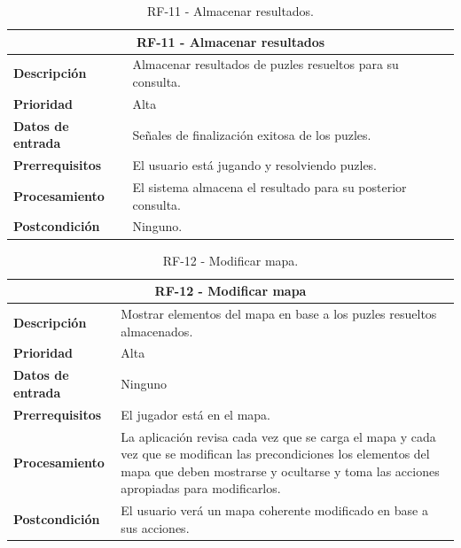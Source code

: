 \begin{table}[H]
	\centering
	\caption{RF-11 - Almacenar resultados.}
	\label{table:RF11}
	\begin{tabular}{|l|p{10cm}|}
		\hline
		\multicolumn{2}{|c|}{\textbf{RF-11 - Almacenar resultados}} \\
		\hline
		\textbf{Descripción} & Almacenar resultados de puzles resueltos para su consulta. \\
		\hline
		\textbf{Prioridad} & Alta \\
		\hline
		\textbf{Datos de entrada} & Señales de finalización exitosa de los puzles. \\
		\hline
		\textbf{Prerrequisitos} & El usuario está jugando y resolviendo puzles. \\
		\hline
		\textbf{Procesamiento} & El sistema almacena el resultado para su posterior consulta. \\
		\hline
		\textbf{Postcondición} & Ninguno. \\
		\hline
	\end{tabular}
	
\end{table}
\begin{table}[H]
	\centering
	\caption{RF-12 - Modificar mapa.}
	\label{table:RF12}
	\begin{tabular}{|l|p{10cm}|}
		\hline
		\multicolumn{2}{|c|}{\textbf{RF-12 - Modificar mapa}} \\
		\hline
		\textbf{Descripción} &  Mostrar elementos del mapa en base a los puzles resueltos almacenados. \\
		\hline
		\textbf{Prioridad} & Alta \\
		\hline
		\textbf{Datos de entrada} & Ninguno \\
		\hline
		\textbf{Prerrequisitos} & El jugador está en el mapa. \\
		\hline
		\textbf{Procesamiento} & La aplicación revisa cada vez que se carga el mapa y cada vez que se modifican las precondiciones los elementos del mapa que deben mostrarse y ocultarse y toma las acciones apropiadas para modificarlos. \\
		\hline
		\textbf{Postcondición} & El usuario verá un mapa coherente modificado en base a sus acciones. \\
		\hline
	\end{tabular}
	
\end{table}

